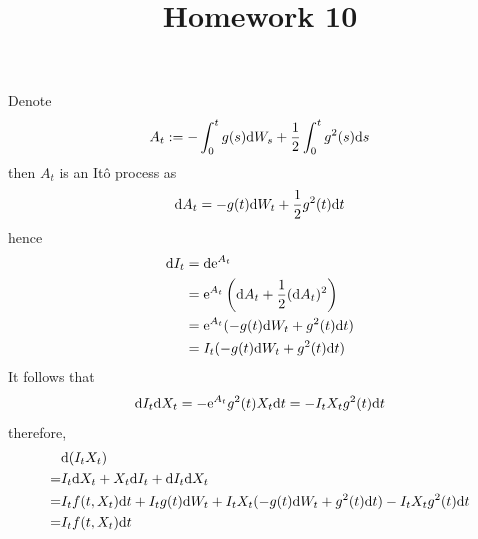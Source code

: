 \documentclass{homework}
\title{Homework 10}
\begin{document}
    \maketitle

    \problem

    \problem
    Denote
    \[A_t:=-\int_0^tg(s)\mathrm d W_s+\frac{1}{2}\int_0^tg^2(s)\mathrm d s\]
    then $A_t$ is an It\^o process as
    \[\mathrm d A_t=-g(t)\mathrm d W_t+\frac{1}{2}g^2(t)\mathrm d t\]
    hence
    \[\begin{aligned}
        \mathrm d I_t&=\mathrm d \mathrm e^{A_t}\\
        &=\mathrm e^{A_t}\left(\mathrm d A_t+\frac{1}{2}(\mathrm d A_t)^2\right)\\
        &=\mathrm e^{A_t}(-g(t)\mathrm d W_t+g^2(t)\mathrm d t)\\
        &=I_t(-g(t)\mathrm d W_t+g^2(t)\mathrm d t)
    \end{aligned}\]
    It follows that
    \[\mathrm d I_t\mathrm d X_t=-\mathrm e^{A_t}g^2(t)X_t\mathrm d t=-I_tX_tg^2(t)\mathrm d t\]
    therefore,
    \[\begin{aligned}
        &\mathrm d(I_tX_t)\\
        =&I_t\mathrm d X_t+X_t\mathrm d I_t+\mathrm d I_t\mathrm d X_t\\
        =&I_tf(t,X_t)\mathrm d t+I_tg(t)\mathrm d W_t+I_tX_t(-g(t)\mathrm d W_t+g^2(t)\mathrm d t)
        -I_tX_tg^2(t)\mathrm d t\\
        =&I_tf(t,X_t)\mathrm d t
    \end{aligned}\]
\end{document}
